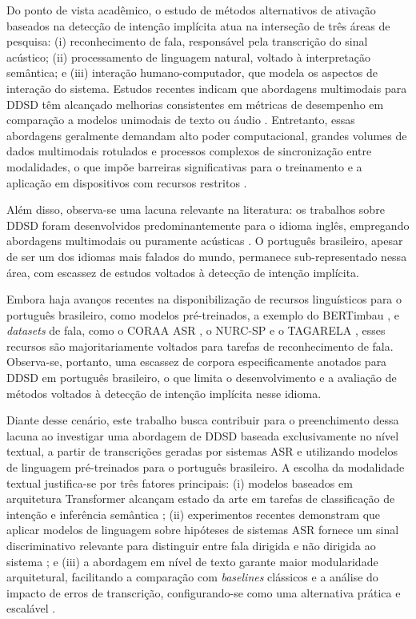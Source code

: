 \documentclass[
    12pt,                %
    openright,           %
    oneside,             %
    a4paper,             %
    english,             %
    brazil               %
]{abntex2}
\begin{document}
Do ponto de vista acadêmico, o estudo de métodos alternativos de ativação baseados na detecção de intenção implícita atua na interseção de três áreas de pesquisa: (i) reconhecimento de fala, responsável pela transcrição do sinal acústico; (ii) processamento de linguagem natural, voltado à interpretação semântica; e (iii) interação humano-computador, que modela os aspectos de interação do sistema. Estudos recentes indicam que abordagens multimodais para DDSD têm alcançado melhorias consistentes em métricas de desempenho em comparação a modelos unimodais de texto ou áudio \cite{Wagner2024}. Entretanto, essas abordagens geralmente demandam alto poder computacional, grandes volumes de dados multimodais rotulados e processos complexos de sincronização entre modalidades, o que impõe barreiras significativas para o treinamento e a aplicação em dispositivos com recursos restritos \cite{Xu2024}.

Além disso, observa-se uma lacuna relevante na literatura: os trabalhos sobre DDSD foram desenvolvidos predominantemente para o idioma inglês, empregando abordagens multimodais ou puramente acústicas \cite{Norouzian2019, Krishna2023}. O português brasileiro, apesar de ser um dos idiomas mais falados do mundo, permanece sub-representado nessa área, com escassez de estudos voltados à detecção de intenção implícita. 

Embora haja avanços recentes na disponibilização de recursos linguísticos para o português brasileiro, como modelos pré-treinados, a exemplo do BERTimbau \cite{Souza2020}, e \textit{datasets} de fala, como o CORAA ASR \cite{CORAA2023}, o NURC-SP \cite{NURCSP2025} e o TAGARELA \cite{Tagarela2026}, esses recursos são majoritariamente voltados para tarefas de reconhecimento de fala. Observa-se, portanto, uma escassez de corpora especificamente anotados para DDSD em português brasileiro, o que limita o desenvolvimento e a avaliação de métodos voltados à detecção de intenção implícita nesse idioma.

Diante desse cenário, este trabalho busca contribuir para o preenchimento dessa lacuna ao investigar uma abordagem de DDSD baseada exclusivamente no nível textual, a partir de transcrições geradas por sistemas ASR e utilizando modelos de linguagem pré-treinados para o português brasileiro. A escolha da modalidade textual justifica-se por três fatores principais: (i) modelos baseados em arquitetura Transformer alcançam estado da arte em tarefas de classificação de intenção e inferência semântica \cite{Weld2022}; (ii) experimentos recentes demonstram que aplicar modelos de linguagem sobre hipóteses de sistemas ASR fornece um sinal discriminativo relevante para distinguir entre fala dirigida e não dirigida ao sistema \cite{Wagner2024, Dighe2024}; e (iii) a abordagem em nível de texto garante maior modularidade arquitetural, facilitando a comparação com \textit{baselines} clássicos e a análise do impacto de erros de transcrição, configurando-se como uma alternativa prática e escalável \cite{Dighe2024}.
\end{document}
